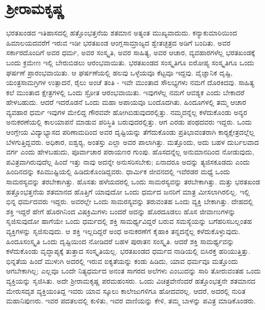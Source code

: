 
\chapter{ಶ‍್ರೀರಾಮಕೃಷ್ಣ}

ಭರತಖಂಡದ ಇತಿಹಾಸದಲ್ಲಿ ಹತ್ತೊಂಭತ್ತನೆಯ ಶತಮಾನ ಅತ್ಯಂತ ಮುಖ್ಯವಾದುದು. ಕನ್ಯಾಕುಮಾರಿಯಿಂದ ಹಿಮಾಲಯದವರೆಗೆ ಇರುವ ಇಡೀ ಭರತಖಂಡ ಆಂಗ್ಲ\break ಸಾಮ್ರಾಜ್ಯದ ಶ್ವೇತಚ್ಛತ್ರದ ಅಡಿಗೆ ಬಂದಿತು. ಅವರ ಸರ್ಕಾರದೊಂದಿಗೆ ಅವರ ಧರ್ಮ, ಅವರ ಸಂಸ್ಕೃತಿ, ಅವರ ಸಾಹಿತ್ಯ, ಅವರ ಆಚಾರ, ವ್ಯವಹಾರಗಳೆಲ್ಲ ಭರತಖಂಡಕ್ಕೆ ಬಂದು ಕ್ರಮೇಣ ಇಲ್ಲಿ ಬೇರುಬಿಡಲು ಆರಂಭವಾಯಿತು. ಭರತಖಂಡದ ಸಂಸ್ಕೃತಿಗೂ ಐರೋಪ್ಯ ಸಂಸ್ಕೃತಿಗೂ ಒಂದು ಘರ್ಷಣೆ ಪ್ರಾರಂಭವಾಯಿತು. ಆ ಘರ್ಷಣೆಯಲ್ಲಿ ಹಲವು ಒಳ್ಳೆಯವೂ ಕೆಟ್ಟವೂ ಇದ್ದವು. ವೈಜ್ಞಾನಿಕ ದೃಷ್ಟಿ, ಯಂತ್ರಸಾಮಗ್ರಿಗಳ ಉತ್ಪಾದನೆ, ರೈಲು ಅಂಚೆ ತಂತಿ - ಇವೇ ಮುಂತಾದ ಸೌಲಭ್ಯಗಳು ನಮಗೆ ದೊರಕಿದವು. ಸಾಹಿತ್ಯ ಕಲೆ ಮುಂತಾದ ಕ್ಷೇತ್ರಗಳಲ್ಲಿ ಒಂದು ಸ್ರೋತ ಆರಂಭವಾಯಿತು. ಇವುಗಳೆಲ್ಲ ನಮಗೆ ಆವಶ್ಯಕ ಎಂದು ಬೇಕಾದರೆ ಹೇಳಬಹುದು. ಆದರೆ ಇದರೊಡನೆ ಒಂದು ಮಹಾ ಅಪಾಯವೂ ಬಂದೊದಗಿತು. ಹಿಂದೂಗಳಲ್ಲಿ ತಮ್ಮ ಆಚಾರ ವ್ಯವಹಾರ ಧರ್ಮ ಇವುಗಳ ಮೇಲಿದ್ದ ಗೌರವವೇ ಹೋಗಿಬಿಡುವುದರಲ್ಲಿತ್ತು. ನಮ್ಮದನ್ನೆಲ್ಲ ಕಳೆದುಕೊಂಡು ಅನ್ಯರ ಅನುಕರಣೆಯಲ್ಲಿ ಕಾಲಯಾಪನೆ ಮಾಡುವ ಪರಿಸ್ಥಿತಿ ಬರುವುದರಲ್ಲಿತ್ತು. ಆಗ ಎರಡು ಪಂಥದವರು ಇದ್ದರು. ಒಂದು ಆಂಗ್ಲೇಯ ವಿದ್ಯಾಭ್ಯಾಸದ ಪರಿಣಾಮದಿಂದ ಅವರ ದೃಷ್ಟಿಯನ್ನು ತೆಗೆದುಕೊಂಡು ಪ್ರತಿಭಾವಂತರಾಗಿ ಕಾರ‍್ಯಕ್ಷೇತ್ರದಲ್ಲೆಲ್ಲ ಬೆಳಗುತ್ತಿದ್ದವರು. ಅಧಿಕಾರ, ಐಶ್ವರ‍್ಯ, ಅಂತಸ್ತು ಎಲ್ಲಾ ಅವರ ಪಾಲಾಗಿತ್ತು. ಮತ್ತೊಂದು, ಅದು ಬಹಳ ದುರ್ಬಲವಾದ ವರ್ಗ ಎಂದು ಹೇಳಬಹುದು, ಪೂರ್ವಾಚಾರ ಪರಾಯಣರ ಗುಂಪು. ಹೊಸದನ್ನೆಲ್ಲ ಅನುಮಾನದಿಂದ ನೋಡುವುದು, ಪವಿತ್ರವಾಗಿರುವುದೆಲ್ಲ ಹಿಂದೆ ಇತ್ತು ನಾವು ಅದನ್ನೇ ಅನುಸರಿಸಬೇಕು; ಏನಾದರೂ ಅದನ್ನು ತ್ಯಜಿಸಕೂಡದು ಎಂದು ಹಿಂದಿನದನ್ನು ಕಪಿಮುಷ್ಟಿಯಲ್ಲಿ ಹಿಡಿದುಕೊಂಡಿದ್ದವರು. ಧಾರ್ಮಿಕ ಜೀವನದಲ್ಲಿ ಇವೆರಡರ ಮಧ್ಯೆ ಒಂದು ಸಾಮರಸ್ಯವನ್ನು ತರಬೇಕಾಗಿತ್ತು. ಹೊಸತು ಹಳೆಯದರಲ್ಲಿ ಒಂದು ಸಾಮರಸ್ಯವನ್ನು ತರಬೇಕಾಗಿತ್ತು. ಮತ್ತು ಭರತಖಂಡ ಹತ್ತೊಂಭತ್ತನೆಯ ಶತಮಾನದ ಹೊತ್ತಿಗೆ ಯಾವುದೋ ಒಂದು ಧರ್ಮದ ಜನರಿಗೆ ಮಾತ್ರ ಮೀಸಲಾಗಿರಲಿಲ್ಲ. ಇಲ್ಲಿ ಭಿನ್ನ ಧರ್ಮದವರು ಇದ್ದರು. ಅವರಲ್ಲೇ ಒಂದು ಸಾಮರಸ್ಯವನ್ನು ತರುವಂತಹ ಒಂದು ವ್ಯಕ್ತಿ ಬೇಕಾಗಿತ್ತು. ದೇಹದಲ್ಲಿ ಶಕ್ತಿ ಇದ್ದರೆ ಹೇಗೆ ಹೊರಗಿನಿಂದ ವಿಷಕ್ರಿಮಿಗಳು ಬಂದರೆ ಅದನ್ನು ಹೊರದೂಡಲು ಹೊಸ ಜೀವಾಣುಗಳನ್ನು ಸೃಜಿಸುವುದೋ ಹಾಗೆಯೇ ಒಂದು ಧರ್ಮದಲ್ಲಿ ಶಕ್ತಿ ಸಾಮರ್ಥ್ಯವಿದ್ದರೆ ಬರುವ ಸಮಸ್ಯೆಯನ್ನು ಬಗೆಹರಿಸಬಲ್ಲಂತಹ ವ್ಯಕ್ತಿಗಳನ್ನು ಸೃಜಿಸುವುದು. ಆ ಶಕ್ತಿ ಇಲ್ಲದಿದ್ದರೆ ಅಂಧ ಅನುಕರಣೆಗೆ ಕೈಹಾಕಿ ತನ್ನದನ್ನೆಲ್ಲ ಕಳೆದುಕೊಳ್ಳುವುದು. ಹಿಂದೂಸಂಸ್ಕೃತಿ ಒಂದು ದೃಷ್ಟಿಯಿಂದ ನೋಡಿದರೆ ಬಹಳ ಪುರಾತನ ಸಂಸ್ಕೃತಿ. ಆದರೆ ಶಕ್ತಿ ಸಾಮರ್ಥ್ಯವನ್ನು ಕಳೆದುಕೊಂಡು ವೃದ್ಧಾಪ್ಯಕ್ಕೆ ತುತ್ತಾದ ಸಂಸ್ಕೃತಿಯಲ್ಲ. ಭರತಖಂಡದ ಧರ್ಮದ ನಾಡಿಯಲ್ಲಿ ಬಿಸಿರಕ್ತ ಹರಿಯುತ್ತಿತ್ತು. ಭಿನ್ನತೆಯ ಹಿಂದೆ ಮುಳುಗಿ ಅದರಲ್ಲಿ ಇರುವ ಐಕ್ಯತೆಯನ್ನು ಕಂಡು ಹಿಡಿದು, ಯಾವ ಧರ್ಮವೂ ಮತ್ತೊಂದು ಆಗಬೇಕಾಗಿಲ್ಲ; ಎಲ್ಲವೂ ಒಂದೇ ನಿತ್ಯಧರ್ಮದ ಅನಂತ ಸಾಗರದ ಅಲೆಗಳು ಎಂಬುದನ್ನು ಸಾರಿ ತೋರುವಂತಹ ಒಂದು ವ್ಯಕ್ತಿಯನ್ನು ಸೃಜಿಸಿತು. ಅದೇ ಶ‍್ರೀರಾಮಕೃಷ್ಣ ಪರಮಹಂಸರು. ಒಂದು ವಿಚಿತ್ರವೇನೆಂದರೆ ಹತ್ತೊಂಭತ್ತನೇ ಶತಮಾನದ ಮೇರುಸದೃಶ ವ್ಯಕ್ತಿಯಂತಿದ್ದ ಇವರು ಯಾವ ಸ್ಕೂಲು ಕಾಲೇಜುಗಳಿಗೂ ಹೋದವರಲ್ಲ. ಆದರೆ, ಅದರಲ್ಲಿ ನುರಿತ ಮಹಾನಿಪುಣರು. ಇವರ ಪದತಲದಲ್ಲಿ ಕುಳಿತು, ಇವರ ವಾಣಿಯನ್ನು ಕೇಳಿ, ತಮ್ಮ ಬಾಳನ್ನು ಪವಿತ್ರ ಮಾಡಿಕೊಂಡರು.

